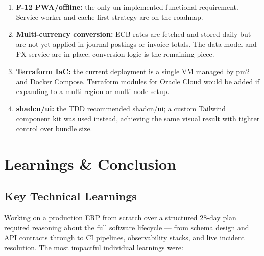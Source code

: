 \documentclass[11pt,a4paper]{article}
\begin{document}
\begin{enumerate}
  \item \textbf{F-12 PWA/offline:} the only un-implemented functional requirement.
  Service worker and cache-first strategy are on the roadmap.
  \item \textbf{Multi-currency conversion:} ECB rates are fetched and stored daily but
  are not yet applied in journal postings or invoice totals. The data model and FX
  service are in place; conversion logic is the remaining piece.
  \item \textbf{Terraform IaC:} the current deployment is a single VM managed by pm2
  and Docker Compose. Terraform modules for Oracle Cloud would be added if expanding
  to a multi-region or multi-node setup.
  \item \textbf{shadcn/ui:} the TDD recommended shadcn/ui; a custom Tailwind component
  kit was used instead, achieving the same visual result with tighter control over
  bundle size.
\end{enumerate}

\section{Learnings \& Conclusion}\label{sec:conclusion}

\subsection{Key Technical Learnings}

Working on a production ERP from scratch over a structured 28-day plan required
reasoning about the full software lifecycle --- from schema design and API contracts
through to CI pipelines, observability stacks, and live incident resolution. The most
impactful individual learnings were:
\end{document}
